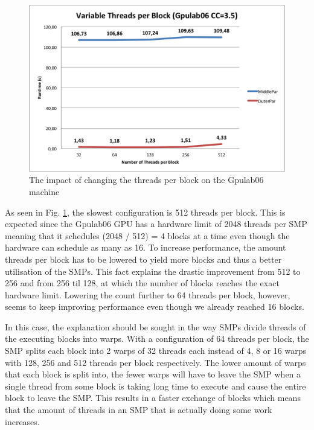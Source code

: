 \begin{figure}
\begin{center}
	\includegraphics[width=\textwidth]{img/Gpulab-tpb35.png}
\end{center}
\caption{The impact of changing the threads per block on the Gpulab06 machine}
\label{ThreadsPerBlockGraph}
\end{figure}

\noindent As seen in Fig. \ref{ThreadsPerBlockGraph}, the slowest configuration is 512 threads per block. This is expected since the Gpulab06 GPU has a hardware limit of 2048 threads per SMP meaning that it schedules (2048 / 512) = 4 blocks at a time even though the hardware can schedule as many as 16. To increase performance, the amount threads per block has to be lowered to yield more blocks and thus a better utilisation of the SMPs. This fact explains the drastic improvement from 512 to 256 and from 256 til 128, at which the number of blocks reaches the exact hardware limit. Lowering the count further to 64 threads per block, however, seems to keep improving performance even though we already reached 16 blocks. 

In this case, the explanation should be sought in the way SMPs divide threads of the executing blocks into warps. With a configuration of 64 threads per block, the SMP splits each block into 2 warps of 32 threads each instead of 4, 8 or 16 warps with 128, 256 and 512 threads per block respectively. The lower amount of warps that each block is split into, the fewer warps will have to leave the SMP when a single thread from some block is taking long time to execute and cause the entire block to leave the SMP. This results in a faster exchange of blocks which means that the amount of threads in an SMP that is actually doing some work increases.\\

